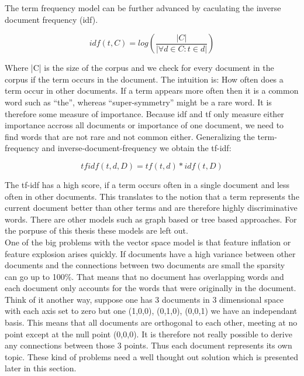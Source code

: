    The term frequency model can be further advanced by caculating the inverse document frequency (idf).

    \begin{equation}
      idf(t, C) = log(\frac{|C|}{|\forall d \in C : t \in d|})
    \end{equation}

    Where |C| is the size of the corpus and we check for every document in the corpus if the term occurs in the document. The intuition is: How often does a term occur in other documents. If a term appears more often then it is a common word such as ``the'', whereas ``super-symmetry'' might be a rare word. It is therefore some measure of importance. Because idf and tf only measure either importance accross all documents or importance of one document, we need to find words that are not rare and not common either. Generalizing the term-frequency and inverse-document-frequency we obtain the tf-idf:

    \begin{equation}
      tfidf(t, d, D) = tf(t, d) * idf(t, D)
    \end{equation}

    The tf-idf has a high score, if a term occurs often in a single document and less often in other documents. This translates to the notion that a term represents the current document better than other terms and are therefore highly discriminative words. There are other models such as graph based or tree based approaches. For the porpuse of this thesis these models are left out. \cite{Nothing}\\

    One of the big problems with the vector space model is that feature inflation or feature explosion arises quickly. If documents have a high variance between other documents and the connections between two documents are small the sparsity can go up to 100\%. That means that no document has overlapping words and each document only accounts for the words that were originally in the document. Think of it another way, suppose one has 3 documents in 3 dimensional space with each axis set to zero but one (1,0,0), (0,1,0), (0,0,1) we have an independant basis. This means that all documents are orthogonal to each other, meeting at no point except at the null point (0,0,0). It is therefore not really possible to derive any connections between those 3 points. Thus each document represents its own topic.
    These kind of problems need a well thought out solution which is presented later in this section.


